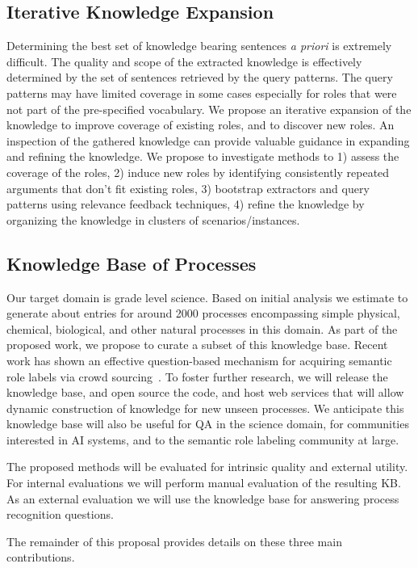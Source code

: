 \subsection{Iterative Knowledge Expansion} 
Determining the best set of knowledge bearing sentences {\em a priori} is extremely difficult. 
The quality and scope of the extracted knowledge is effectively determined by the set of sentences retrieved by the query patterns.
The query patterns may have limited coverage in some cases especially for roles that were not part of the pre-specified vocabulary.
We propose an iterative expansion of the knowledge to improve coverage of existing roles, and to discover new roles. 
An inspection of the gathered knowledge can provide valuable guidance in expanding and refining the knowledge.
We propose to investigate methods to 1) assess the coverage of the roles, 2) induce new roles by identifying consistently repeated arguments that don't fit existing roles,  
3) bootstrap extractors and query patterns using relevance feedback techniques, 4) refine the knowledge by organizing the knowledge in clusters of scenarios/instances.

\subsection{Knowledge Base of Processes}

Our target domain is grade level science. 
Based on initial analysis we estimate to generate about entries for around 2000 processes encompassing simple physical, chemical, biological, and other natural processes in this domain. 
As part of the proposed work, we propose to curate a subset of this knowledge base. Recent work has shown an effective question-based mechanism for acquiring semantic role labels
via crowd sourcing~\cite{hequestion}. To foster further research, we will release the knowledge base, and open source the code, and host web services that will allow dynamic construction of knowledge for new unseen processes. We anticipate this knowledge base will also be useful for QA in the science domain, for communities interested in AI systems, 
and to the semantic role labeling community at large.

The proposed methods will be evaluated for intrinsic quality and external utility. For internal evaluations we will perform manual evaluation of the resulting KB. 
As an external evaluation we will use the knowledge base for answering process recognition questions.

The remainder of this proposal provides details on these three main contributions.


